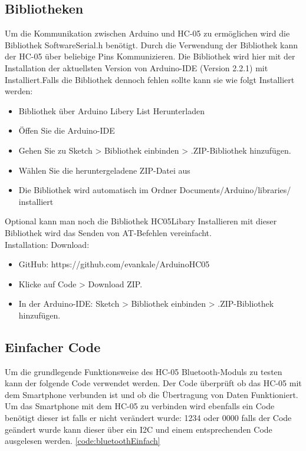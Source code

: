 \subsection{Bibliotheken}

Um die Kommunikation zwischen Arduino und HC-05 zu ermöglichen wird die Bibliothek SoftwareSerial.h benötigt. Durch die Verwendung der Bibliothek kann der HC-05 über beliebige Pins Kommunizieren. Die Bibliothek wird hier mit der Installation der aktuellsten Version von Arduino-IDE (Version 2.2.1) mit Installiert.Falls die Bibliothek dennoch fehlen sollte kann sie wie folgt Installiert werden:

\begin{itemize}
	\item Bibliothek über Arduino Libery List Herunterladen
	\item Öffen Sie die Arduino-IDE
	\item Gehen Sie zu Sketch > Bibliothek einbinden > .ZIP-Bibliothek hinzufügen.
	\item Wählen Sie die heruntergeladene ZIP-Datei aus
	\item Die Bibliothek wird automatisch im Ordner Documents/Arduino/libraries/ installiert 
\end{itemize}
 
Optional kann man noch die Bibliothek HC05Libary Installieren mit dieser Bibliothek wird das Senden von AT-Befehlen vereinfacht.\\

Installation: Download:

\begin{itemize}
	\item GitHub: https://github.com/evankale/ArduinoHC05
	\item Klicke auf Code > Download ZIP.
	\item In der Arduino-IDE: Sketch > Bibliothek einbinden > .ZIP-Bibliothek hinzufügen.
\end{itemize}


\subsection{Einfacher Code}
Um die grundlegende Funktionsweise des HC-05 Bluetooth-Moduls zu testen kann der folgende Code verwendet werden. Der Code überprüft ob das HC-05 mit dem Smartphone verbunden ist und ob die Übertragung von Daten Funktioniert. Um das Smartphone mit dem HC-05 zu verbinden wird ebenfalls ein Code benötigt dieser ist falls er nicht verändert wurde: 1234 oder 0000 falls der Code geändert wurde kann dieser über ein I2C und einem entsprechenden Code ausgelesen werden. \ref{code:bluetoothEinfach}

